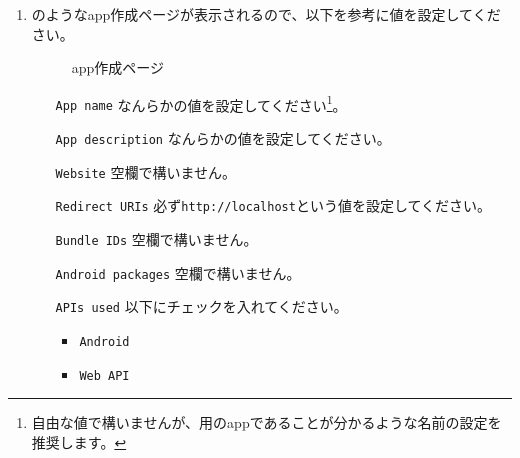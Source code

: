 \begin{enumerate}
                \newpage
                \item {}のようなapp作成ページが表示されるので、以下を参考に値を設定してください。
                \label{item:spotify7}
                    \begin{figure}[htbp]
                        \centering
                        \caption{app作成ページ}
                        \label{img:spotify6}
                    \end{figure}
                    \begin{itemize}
                        \item[\texttt{App name}] なんらかの値を設定してください\footnote{自由な値で構いませんが、\bj 用のappであることが分かるような名前の設定を推奨します。}。
                        \item[\texttt{App description}] なんらかの値を設定してください。
                        \item[\texttt{Website}] 空欄で構いません。
                        \item[\texttt{Redirect URIs}] 必ず\texttt{http://localhost}という値を設定してください。
                        \item[\texttt{Bundle IDs}] 空欄で構いません。
                        \item[\texttt{Android packages}] 空欄で構いません。
                        \item[\texttt{APIs used}] 以下にチェックを入れてください。
                            \begin{itemize}
                                \item \texttt{Android}
                                \item \texttt{Web API}
                            \end{itemize}
                    \end{itemize}


\end{enumerate}
